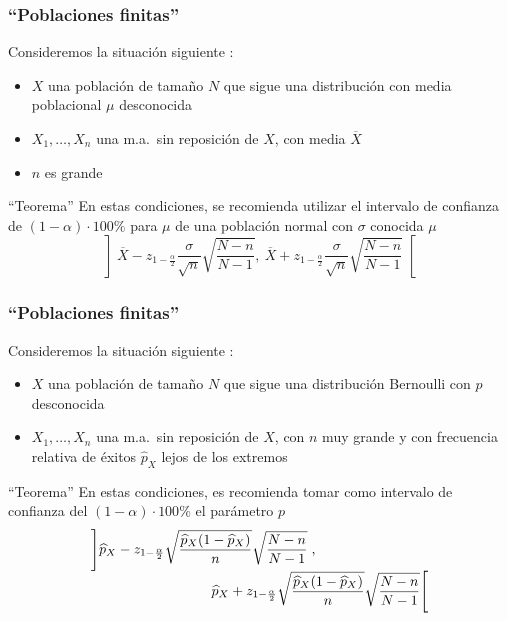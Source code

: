 \documentclass[12pt,t]{beamer}
\theoremstyle{plain}
\theoremstyle{definition}
\begin{document}
\begin{frame}
\frametitle{``Poblaciones finitas''}

Consideremos  la situación siguiente  :
\begin{itemize}
\item  $X$ una población de  tamaño  $N$ que sigue una distribución con media   poblacional $\mu$ desconocida

\item $X_1,\ldots,X_n$ una m.a.\ sin reposición de $X$, con media   $\overline{X}$

\item  $n$ es grande 
\end{itemize}

\begin{block}{``Teorema''}
En estas  condiciones, se recomienda utilizar el intervalo de confianza de $(1-\alpha)\cdot 100\%$  para $\mu$ de una población normal con $\sigma$ conocida
$\mu$
$$
\left]\overline{X}-z_{1-\frac{\alpha}{2}}\frac{\sigma}{\sqrt{n}}\sqrt{\frac{N-n}{N-1}},\
    \overline{X}+z_{1-\frac{\alpha}{2}}\frac{\sigma}{\sqrt{n}}\sqrt{\frac{N-n}{N-1}}\right[
$$
\end{block}



\end{frame}




\begin{frame}
\frametitle{``Poblaciones finitas''}
\vspace*{-2ex}

Consideremos  la situación siguiente  :
\begin{itemize}
\item  $X$ una población de  tamaño  $N$ que sigue una distribución Bernoulli con $p$ desconocida

\item $X_1,\ldots,X_n$ una m.a.\ sin reposición de $X$, con $n$ muy grande  y con frecuencia relativa de éxitos $\widehat{p}_{X}$ lejos de los  extremos
\end{itemize}
\medskip

\begin{block}{``Teorema''}
En estas  condiciones, es recomienda tomar como  intervalo  de confianza  del $(1-\alpha)\cdot 100\%$ el parámetro $p$
$$
\begin{array}{l}
\displaystyle \left]\widehat{p}_{X}-z_{1-\frac{\alpha}{2}}\sqrt{\frac{\widehat{p}_{X}
(1-\widehat{p}_{X})}{n}}\sqrt{\frac{N-n}{N-1}}\right.,\\[1ex]
\hspace*{3cm}\displaystyle
\left.\widehat{p}_{X}+z_{1-\frac{\alpha}{2}}\sqrt{\frac{\widehat{p}_{X}
(1-\widehat{p}_{X})}{n}}\sqrt{\frac{N-n}{N-1}}\right[
\end{array}$$
\end{block}
\end{frame}
\end{document}
